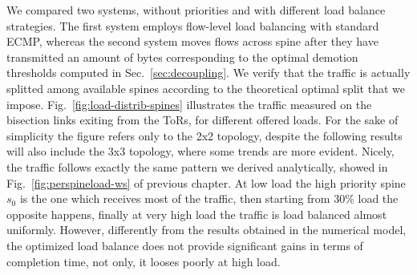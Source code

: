 We compared two systems, without priorities and with different load balance strategies. The first system employs flow-level load balancing with standard ECMP, whereas the second system moves flows across spine after they have transmitted an amount of bytes corresponding to the optimal demotion thresholds computed in Sec.~\ref{sec:decoupling}. We verify that the traffic is actually splitted among available spines according to the theoretical optimal split that we impose. Fig.~\ref{fig:load-distrib-spines} illustrates the traffic measured on the bisection links exiting from the ToRs, for different offered loads. For the sake of simplicity the figure refers only to the 2x2 topology, despite the following results will also include the 3x3 topology, where some trends are more evident. Nicely, the traffic follows exactly the same pattern we derived analytically, showed in Fig.~\ref{fig:perspineload-ws} of previous chapter. At low load the high priority spine $s_0$ is the one which receives most of the traffic, then starting from 30\% load the opposite happens, finally at very high load the traffic is load balanced almost uniformly. However, differently from the results obtained in the numerical model, the optimized load balance does not provide significant gains in terms of completion time, not only, it looses poorly at high load.
